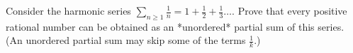 Consider the harmonic series $\displaystyle{\sum_{n\ge 1} \frac{1}{n} = 1 +
\frac{1}{2} + \frac{1}{3} \dots}$. Prove that every positive rational number
can be obtained as an *unordered* partial sum of this series. (An unordered
partial sum may skip some of the terms $\frac{1}{k}$.)
